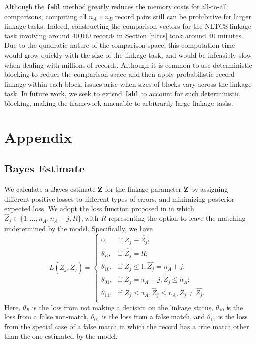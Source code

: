 \documentclass[ba]{imsart}
\begin{document}
	Although the \texttt{fabl} method greatly reduces the memory costs for all-to-all comparisons, computing all $n_A \times n_B$ record pairs still can be prohibitive for larger linkage tasks. Indeed, constructing the comparison vectors for the NLTCS linkage task involving around 40,000 records in Section \ref{nltcs} took around 40 minutes. Due to the quadratic nature of the comparison space, this computation time would grow quickly with the size of the linkage task, and would be infeasibly slow when dealing with millions of records. Although it is common to use deterministic blocking to reduce the comparison space and then apply probabilistic record linkage within each block, issues arise when sizes of blocks vary across the linkage task. In future work, we seek to extend \texttt{fabl} to account for such deterministic blocking, making the framework amenable to arbitrarily large linkage tasks.

	
	\clearpage
	
	\bigskip
	
	
	
	
	\clearpage
	
	\section{Appendix}
	\label{sec:appendix}
	
	\hypertarget{bayes-estimate}{%
		\subsection{Bayes Estimate}
		\label{bayes-estimate}}
	
We calculate a Bayes estimate $\hat{\bm{Z}}$ for the linkage parameter $\bm{Z}$ by assigning different positive losses to different types of errors, and minimizing posterior expected loss. We adopt the loss function proposed in \cite{sadinle_bayesian_2017} in which $\hat{Z}_j \in \{1, \ldots, n_A, n_A + j, R\}$, with $R$ representing the option to leave the matching undetermined by the model. Specifically, we have
	\[L(\hat{Z_j}, Z_j)=\begin{cases} 
		0,  & \text{if } Z_j = \hat{Z_j}; \\
		\theta_R,  & \text{if } \hat{Z_j} = R; \\
		\theta_{10},  & \text{if } Z_j \leq 1,\hat{Z_j} = n_A + j ; \\
		\theta_{01},  & \text{if } Z_j = n_A + j,\hat{Z_j} \leq n_A ; \\
		\theta_{11},  & \text{if } Z_j \leq n_A, \hat{Z}_j \leq n_A, Z_j \neq \hat{Z_j}. \\
	\end{cases}\] 
Here, $\theta_R$ is the loss from not making a decision on the linkage status, $\theta_{10}$ is the loss from a false non-match, $\theta_{01}$ is the loss from a false match, and $\theta_{11}$ is the loss from the special case of a false match in which the record has a true match other than the one estimated by the model. 
\end{document}
